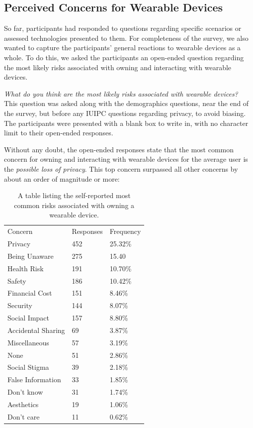 \documentclass{acm_proc_article-sp}
\begin{document}
\subsection{Perceived Concerns for Wearable Devices}
So far, participants had responded to questions regarding specific scenarios or assessed technologies presented to them. For completeness of the survey, we also wanted to capture the participants' general reactions to wearable devices as a whole. To do this, we asked the participants an open-ended question regarding the most likely risks associated with owning and interacting with wearable devices.

\textit{What do you think are the most likely risks associated with wearable devices?}\\[-.5cm]

This question was asked along with the demographics questions, near the end of the survey, but before any IUIPC questions regarding privacy, to avoid biasing. The participants were presented with a blank box to write in, with no character limit to their open-ended responses. 

Without any doubt, the open-ended responses state that the most common concern for owning and interacting with wearable devices for the average user is the \textit{possible loss of privacy}. This top concern surpassed all other concerns by about an order of magnitude or more:

\begin{table}[h]
\begin{center}
\begin{tabular}{lll}

Concern &  Responses &  Frequency   \\
Privacy & 452 & 25.32\% \\
Being Unaware & 275 & 15.40\ \\
Health Risk & 191 & 10.70\%\\
Safety & 186 & 10.42\%\\
Financial Cost & 151 & 8.46\%\\
Security &	144 & 8.07\%\\
Social Impact &	157 & 8.80\%\\
Accidental Sharing &	69 & 3.87\%\\
Miscellaneous &	57 & 3.19\%\\
None	& 51 & 2.86\%\\
Social Stigma &	39 & 2.18\%\\
False Information & 33 & 1.85\%\\
Don't know & 31 & 1.74\%\\
Aesthetics 	& 19 & 1.06\%\\
Don't care 	& 11 & 0.62\%\\

\end{tabular}
\caption{A table listing the self-reported most common risks associated with owning a wearable device.}
\label{open-responses}
\end{center}
\end{table}
\end{document}
